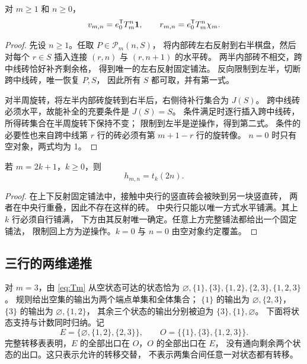 \begin{lemma}[中线补全双射]\label{lem:half}
对 $m\ge1$ 和 $n\ge0$，
\begin{equation}\label{eq:half-fixed}
 v_{m,n}=e_0^{\mathsf T}T_m^n\boldsymbol{1},\qquad
 r_{m,n}=e_0^{\mathsf T}T_m^n\chi_m.
\end{equation}
\end{lemma}
\begin{proof}
先设 $n\ge1$。任取 $P\in\mathcal P_m(n,S)$，
将内部砖左右反射到右半棋盘，然后对每个 $r\in S$
插入连接 $(r,n)$ 与 $(r,n+1)$ 的水平砖。
两半内部砖不相交，跨中线砖恰好补齐剩余格，
得到唯一的左右反射固定铺法。
反向限制到左半，切断跨中线砖，唯一恢复 $P,S$，
因此所有 $S$ 都可取，并有第一式。

对半周旋转，将左半内部砖旋转到右半后，右侧待补行集合为 $J(S)$。
跨中线砖必须水平，故能补全的充要条件是 $J(S)=S$。
条件满足时逐行插入跨中线砖，所得砖集合在半周旋转下保持不变；
限制到左半是逆操作，得到第二式。
条件的必要性也来自跨中线第 $r$ 行的砖必须有第 $m+1-r$ 行的旋转像。
$n=0$ 时只有空对象，两式均为 1。
\end{proof}

\begin{lemma}[奇数高度的上下反射]\label{lem:h-odd}
若 $m=2k+1$，$k\ge0$，则
\begin{equation}\label{eq:h-odd}
 h_{m,n}=t_k(2n).
\end{equation}
\end{lemma}
\begin{proof}
在上下反射固定铺法中，接触中央行的竖直砖会被映到另一块竖直砖，
两者在中央行重叠，因此不存在这样的砖。
中央行只能以唯一方式水平铺满。其上 $k$ 行必须自行铺满，
下方由其反射唯一确定。任意上方完整铺法都给出一个固定铺法，
限制回上方为逆操作。$k=0$ 与 $n=0$ 由空对象约定覆盖。
\end{proof}

\subsection{三行的两维递推}
对 $m=3$，由 \eqref{eq:Tm} 从空状态可达的状态恰为
$\varnothing,\{1\},\{3\},\{1,2\},\{2,3\},\{1,2,3\}$。
规则给出空集的输出为两个端点单集和全体集合；
$\{1\}$ 的输出为 $\varnothing,\{2,3\}$，
$\{3\}$ 的输出为 $\varnothing,\{1,2\}$，
其余三个状态的输出分别被迫为 $\{3\},\{1\},\varnothing$。
下面将状态支持与计数同时归纳。记
\[
 E=\{\varnothing,\{1,2\},\{2,3\}\},\qquad
 O=\{\{1\},\{3\},\{1,2,3\}\}.
\]
完整转移表表明，$E$ 的全部出口在 $O$，$O$ 的全部出口在 $E$，
没有通向剩余两个状态的出口。这只表示允许的转移交替，
不表示两集合间任意一对状态都有转移。

